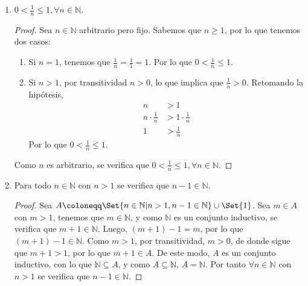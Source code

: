 \documentclass[11pt]{article}
\newcommand{\N}{\mathbb{N}}
\let\set\Set
\let\union\cup
\begin{document}
\begin{enumerate}[label=\alph*)]
\begin{proof}
        Si $n\in A$ debe ser el caso que $n\in \N$ y $1\leq n$. Además, por la cerradura de la suma en $\N$, $n+1\in \N$. Luego, $0 \leq 1$ de donde sigue que $n \leq n+1$. Por transitividad, $1\leq n+1$, por lo que $n+1\in A$, lo que implica que $A$ es un conjunto inductivo, es decir, $\N\subseteq A$ y como $A\subseteq \N$, $A=N$. En otras palabras, $n\geq 1, \forall n\in\N$.
    \end{proof} \vspace{-1em}

    \item $0<\frac{1}{n}\leq 1, \forall n\in \N$.
    \vspace{-1em}\begin{proof} 
        Sea $n\in \N$ arbitrario pero fijo. Sabemos que $n\geq 1$, por lo que tenemos dos casos: \begin{enumerate}[label=\roman*)]
            \item Si $n=1$, tenemos que $\frac{1}{n}=\frac{1}{1}=1$. Por lo que $0<\frac{1}{n}\leq 1$.
            \item Si $n>1$, por transitividad $n>0$, lo que implica que $\frac{1}{n}>0$. Retomando la hipótesis, \begin{align*}
                n &> 1\\
                n \cdot \frac{1}{n} &> 1\cdot \frac{1}{n}\\
                1 &> \frac{1}{n}
            \end{align*} Por lo que $0<\frac{1}{n}\leq 1$. 
        \end{enumerate} Como $n$ es arbitrario, se verifica que $0<\frac{1}{n}\leq 1, \forall n\in \N$.
    \end{proof} \vspace{-1em}

    \item Para todo $n\in \N$ con $n>1$ se verifica que $n-1\in \N$.
    \vspace{-1em}\begin{proof} 
        Sea $A \coloneqq \set{n\in \N | n>1, n-1\in \N}\union \set{1}$. Sea $m\in A$ con $m>1$, tenemos que $m\in \N$, y como $\N$ es un conjunto inductivo, se verifica que $m+1\in\N$. Luego, $(m+1)-1=m$, por lo que $(m+1)-1\in \N$. Como $m>1$, por transitividad, $m>0$, de donde sigue que $m+1>1$, por lo que $m+1\in A$. De este modo, $A$ es un conjunto inductivo, con lo que $\N \subseteq A$, y como $A\subseteq \N$, $A=\N$. Por tanto $\forall n\in \N$ con $n>1$ se verifica que $n-1\in \N$.
    \end{proof} \vspace{-1em}


\end{enumerate}
\end{document}
